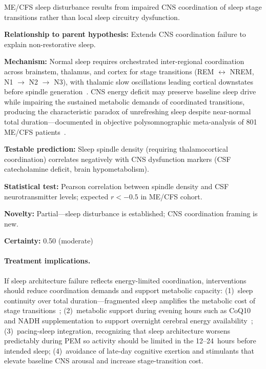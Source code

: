 \begin{hypothesis}
\label{hyp:sleep-architecture}
ME/CFS sleep disturbance results from impaired CNS coordination of sleep stage transitions rather than local sleep circuitry dysfunction.

\textbf{Relationship to parent hypothesis:} Extends CNS coordination failure to explain non-restorative sleep.

\textbf{Mechanism:} Normal sleep requires orchestrated inter-regional coordination across brainstem, thalamus, and cortex for stage transitions (REM $\leftrightarrow$ NREM, N1 $\to$ N2 $\to$ N3), with thalamic slow oscillations leading cortical downstates before spindle generation~\cite{Fernandez2022thalamus}. CNS energy deficit may preserve baseline sleep drive while impairing the sustained metabolic demands of coordinated transitions, producing the characteristic paradox of unrefreshing sleep despite near-normal total duration---documented in objective polysomnographic meta-analysis of 801 ME/CFS patients~\cite{Jackson2023sleep}.

\textbf{Testable prediction:} Sleep spindle density (requiring thalamocortical coordination) correlates negatively with CNS dysfunction markers (CSF catecholamine deficit, brain hypometabolism).

\textbf{Statistical test:} Pearson correlation between spindle density and CSF neurotransmitter levels; expected $r < -0.5$ in ME/CFS cohort.

\textbf{Novelty:} Partial---sleep disturbance is established; CNS coordination framing is new.

\textbf{Certainty:} 0.50 (moderate)

\paragraph{Treatment implications.}
If sleep architecture failure reflects energy-limited coordination, interventions should reduce coordination demands and support metabolic capacity: (1)~sleep continuity over total duration---fragmented sleep amplifies the metabolic cost of stage transitions~\cite{Baud2016fragmentation}; (2)~metabolic support during evening hours such as CoQ10 and NADH supplementation to support overnight cerebral energy availability~\cite{CastroMarrero2021CoQ10}; (3)~pacing-sleep integration, recognizing that sleep architecture worsens predictably during PEM so activity should be limited in the 12--24~hours before intended sleep; (4)~avoidance of late-day cognitive exertion and stimulants that elevate baseline CNS arousal and increase stage-transition cost.


\end{hypothesis}

